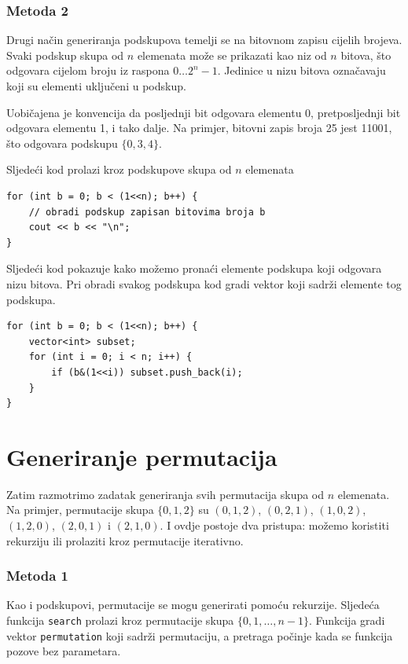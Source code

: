 \subsubsection{Metoda 2}

Drugi način generiranja podskupova temelji se na
bitovnom zapisu cijelih brojeva.
Svaki podskup skupa od $n$ elemenata
može se prikazati kao niz od $n$ bitova,
što odgovara cijelom broju iz raspona $0 \ldots 2^n-1$.
Jedinice u nizu bitova označavaju
koji su elementi uključeni u podskup.

Uobičajena je konvencija da
posljednji bit odgovara elementu 0,
pretposljednji bit odgovara elementu 1,
i tako dalje.
Na primjer, bitovni zapis broja 25
jest 11001, što odgovara podskupu $\{0,3,4\}$.

Sljedeći kod prolazi kroz podskupove
skupa od $n$ elemenata

\begin{lstlisting}
for (int b = 0; b < (1<<n); b++) {
    // obradi podskup zapisan bitovima broja b
    cout << b << "\n";
}
\end{lstlisting}

Sljedeći kod pokazuje kako možemo pronaći
elemente podskupa koji odgovara nizu bitova.
Pri obradi svakog podskupa
kod gradi vektor koji sadrži
elemente tog podskupa.

\begin{lstlisting}
for (int b = 0; b < (1<<n); b++) {
    vector<int> subset;
    for (int i = 0; i < n; i++) {
        if (b&(1<<i)) subset.push_back(i);
    }
}
\end{lstlisting}

\section{Generiranje permutacija}


Zatim razmotrimo zadatak generiranja
svih permutacija skupa od $n$ elemenata.
Na primjer, permutacije skupa $\{0,1,2\}$ su
$(0,1,2)$, $(0,2,1)$, $(1,0,2)$, $(1,2,0)$,
$(2,0,1)$ i $(2,1,0)$.
I ovdje postoje dva pristupa:
možemo koristiti rekurziju ili prolaziti kroz
permutacije iterativno.

\subsubsection{Metoda 1}

Kao i podskupovi, permutacije se mogu generirati
pomoću rekurzije.
Sljedeća funkcija \texttt{search} prolazi
kroz permutacije skupa $\{0,1,\ldots,n-1\}$.
Funkcija gradi vektor \texttt{permutation}
koji sadrži permutaciju,
a pretraga počinje kada se funkcija
pozove bez parametara.

